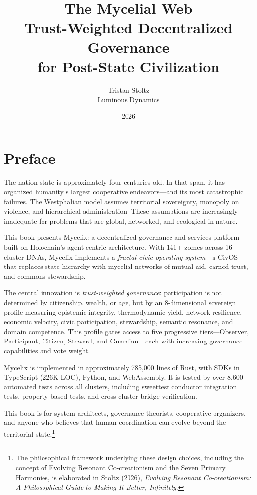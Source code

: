 \documentclass[12pt]{book}
\title{\Huge\textbf{The Mycelial Web} \\[1em]
\Large Trust-Weighted Decentralized Governance \\
for Post-State Civilization}
\author{Tristan Stoltz \\ Luminous Dynamics}
\date{2026}
\begin{document}
\frontmatter
\maketitle

\tableofcontents

\chapter{Preface}

The nation-state is approximately four centuries old. In that span, it has organized
humanity's largest cooperative endeavors---and its most catastrophic failures. The
Westphalian model assumes territorial sovereignty, monopoly on violence, and
hierarchical administration. These assumptions are increasingly inadequate for
problems that are global, networked, and ecological in nature.

This book presents Mycelix: a decentralized governance and services platform built
on Holochain's agent-centric architecture. With 141+ zomes across 16 cluster DNAs,
Mycelix implements a \emph{fractal civic operating system}---a CivOS---that replaces
state hierarchy with mycelial networks of mutual aid, earned trust, and commons
stewardship.

The central innovation is \emph{trust-weighted governance}: participation is not
determined by citizenship, wealth, or age, but by an 8-dimensional sovereign profile measuring
epistemic integrity, thermodynamic yield, network resilience, economic velocity, civic participation, stewardship, semantic resonance, and domain competence.
This profile gates access to five progressive tiers---Observer, Participant, Citizen,
Steward, and Guardian---each with increasing governance capabilities and vote weight.

Mycelix is implemented in approximately 785,000 lines of Rust, with SDKs in
TypeScript (226K LOC), Python, and WebAssembly. It is tested by over 8,600
automated tests across all clusters, including sweettest conductor integration tests,
property-based tests, and cross-cluster bridge verification.

This book is for system architects, governance theorists, cooperative organizers,
and anyone who believes that human coordination can evolve beyond the territorial
state.\footnote{The philosophical framework underlying these design choices, including the concept of Evolving Resonant Co-creationism and the Seven Primary Harmonies, is elaborated in Stoltz (2026), \textit{Evolving Resonant Co-creationism: A Philosophical Guide to Making It Better, Infinitely}.}
\end{document}
